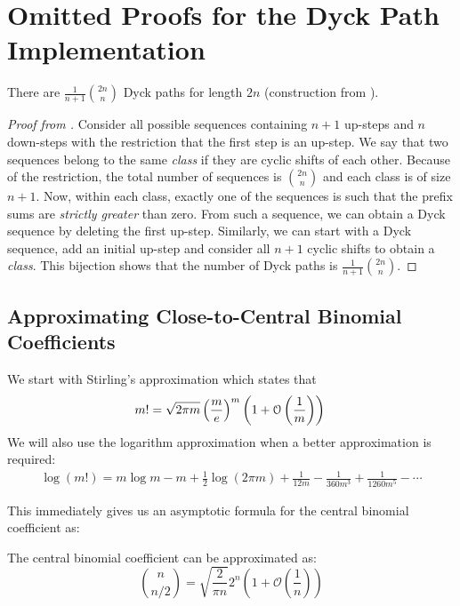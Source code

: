 \section{Omitted Proofs for the Dyck Path Implementation}%
\label{sec:dyck_appendix}

\begin{theorem}
\label{thm:number_of_dyck_paths}
There are $\frac{1}{n+1}\binom{2n}{n}$ Dyck paths for length $2n$ (construction from \cite{catalan_book}).
\end{theorem}
\begin{proof}[Proof from \cite{catalan_book}]
Consider all possible sequences containing $n+1$ up-steps and $n$ down-steps with the restriction that the first step is an up-step.
We say that two sequences belong to the same \emph{class} if they are cyclic shifts of each other.
Because of the restriction, the total number of sequences is $\binom{2n}{n}$ and each class is of size $n+1$.
Now, within each class, exactly one of the sequences is such that the prefix sums are \emph{strictly greater} than zero.
From such a sequence, we can obtain a Dyck sequence by deleting the first up-step.
Similarly, we can start with a Dyck sequence, add an initial up-step and consider all $n+1$ cyclic shifts to obtain a \emph{class}.
This bijection shows that the number of Dyck paths is $ \frac{1}{n+1} \binom{2n}{n}$.
\end{proof}



\subsection{Approximating Close-to-Central Binomial Coefficients}%
\label{sec:approximating_close_to_central_binomial_coefficients}
We start with Stirling's approximation which states that
\[
m! = \sqrt{2\pi m}\left( \frac me\right)^m\left( 1 + \mathcal O\left( \frac 1m\right)\right)\\
\]
We will also use the logarithm approximation when a better approximation is required:
\begin{align}
    \label{eq:log_factorial_approximation}
\log (m!) = m\log m -m + \frac 12 \log(2\pi m) + \frac{1}{12 m} - \frac{1}{360 m^3} + \frac{1}{1260 m^5} - \cdots
\end{align}

This immediately gives us an asymptotic formula for the central binomial coefficient as:
\begin{lemma}
\label{lem:central_binomial_coefficient}
The central binomial coefficient can be approximated as:
\[
\binom{n}{n/2} = \sqrt{\frac{2}{\pi n}}2^n\left( 1 + \mathcal O\left( \frac 1n\right)\right)
\]
\end{lemma}

